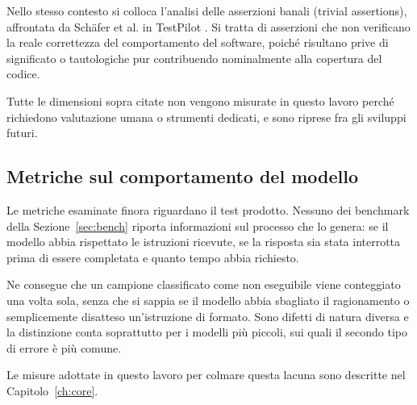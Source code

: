 Nello stesso contesto si colloca l'analisi delle asserzioni banali (trivial assertions), affrontata da Schäfer et al. in TestPilot \cite{schaefer2024testpilot}. Si tratta di asserzioni che non verificano la reale correttezza del comportamento del software, poiché risultano prive di significato o tautologiche pur contribuendo nominalmente alla copertura del codice.

Tutte le dimensioni sopra citate non vengono misurate in questo lavoro perché richiedono valutazione umana o strumenti dedicati, e sono riprese fra gli sviluppi futuri.


\subsection{Metriche sul comportamento del modello}
\label{sec:comportamento}
Le metriche esaminate finora riguardano il test prodotto. Nessuno dei benchmark della Sezione~\ref{sec:bench} riporta informazioni sul processo che lo genera: se il modello abbia rispettato le istruzioni ricevute, se la risposta sia stata interrotta prima di essere completata e quanto tempo abbia richiesto.

Ne consegue che un campione classificato come non eseguibile viene conteggiato una volta sola, senza che si sappia se il modello abbia sbagliato il ragionamento o semplicemente disatteso un'istruzione di formato. Sono difetti di natura diversa e la distinzione conta soprattutto per i modelli più piccoli, sui quali il secondo tipo di errore è più comune.

Le misure adottate in questo lavoro per colmare questa lacuna sono descritte nel Capitolo~\ref{ch:core}.



